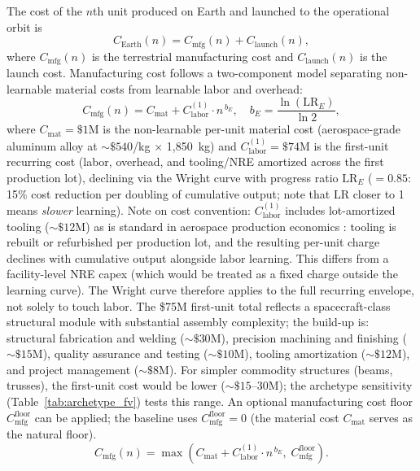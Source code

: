\documentclass[preprint,12pt]{elsarticle}
\begin{document}
The cost of the $n$th unit produced on Earth and launched to the operational orbit is
\begin{equation}
  C_{\mathrm{Earth}}(n) = C_{\mathrm{mfg}}(n) + C_{\mathrm{launch}}(n),
  \label{eq:earth_unit}
\end{equation}
where $C_{\mathrm{mfg}}(n)$ is the terrestrial manufacturing cost and $C_{\mathrm{launch}}(n)$ is the launch cost. Manufacturing cost follows a two-component model separating non-learnable material costs from learnable labor and overhead:
\begin{equation}
  C_{\mathrm{mfg}}(n) = C_{\mathrm{mat}} + C_{\mathrm{labor}}^{(1)} \cdot n^{\,b_E}, \quad b_E = \frac{\ln(\mathrm{LR}_E)}{\ln 2},
  \label{eq:earth_mfg}
\end{equation}
where $C_{\mathrm{mat}} = \$1$M is the non-learnable per-unit material cost (aerospace-grade aluminum alloy at ${\sim}\$540$/kg $\times$ 1{,}850~kg) and $C_{\mathrm{labor}}^{(1)} = \$74$M is the first-unit recurring cost (labor, overhead, and tooling/NRE amortized across the first production lot), declining via the Wright curve with progress ratio $\mathrm{LR}_E$ ($= 0.85$: 15\% cost reduction per doubling of cumulative output; note that $\mathrm{LR}$ closer to 1 means \emph{slower} learning). Note on cost convention: $C_{\mathrm{labor}}^{(1)}$ includes lot-amortized tooling (${\sim}\$12$M) as is standard in aerospace production economics \cite{wertz2011}: tooling is rebuilt or refurbished per production lot, and the resulting per-unit charge declines with cumulative output alongside labor learning. This differs from a facility-level NRE capex (which would be treated as a fixed charge outside the learning curve). The Wright curve therefore applies to the full recurring envelope, not solely to touch labor. The \$75M first-unit total reflects a spacecraft-class structural module with substantial assembly complexity; the build-up is: structural fabrication and welding (${\sim}\$30$M), precision machining and finishing (${\sim}\$15$M), quality assurance and testing (${\sim}\$10$M), tooling amortization (${\sim}\$12$M), and project management (${\sim}\$8$M). For simpler commodity structures (beams, trusses), the first-unit cost would be lower (${\sim}\$15$--$30$M); the archetype sensitivity (Table~\ref{tab:archetype_fv}) tests this range. An optional manufacturing cost floor $C_{\mathrm{mfg}}^{\mathrm{floor}}$ can be applied; the baseline uses $C_{\mathrm{mfg}}^{\mathrm{floor}} = 0$ (the material cost $C_{\mathrm{mat}}$ serves as the natural floor).
\begin{equation}
  C_{\mathrm{mfg}}(n) = \max\!\left(C_{\mathrm{mat}} + C_{\mathrm{labor}}^{(1)} \cdot n^{\,b_E},\; C_{\mathrm{mfg}}^{\mathrm{floor}}\right).
  \label{eq:earth_mfg_floor}
\end{equation}
\end{document}
